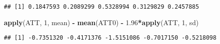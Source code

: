\documentclass[]{article}
\newenvironment{Shaded}{\begin{snugshade}}{\end{snugshade}}
\newcommand{\KeywordTok}[1]{\textcolor[rgb]{0.13,0.29,0.53}{\textbf{#1}}}
\newcommand{\DecValTok}[1]{\textcolor[rgb]{0.00,0.00,0.81}{#1}}
\newcommand{\FloatTok}[1]{\textcolor[rgb]{0.00,0.00,0.81}{#1}}
\newcommand{\StringTok}[1]{\textcolor[rgb]{0.31,0.60,0.02}{#1}}
\newcommand{\OperatorTok}[1]{\textcolor[rgb]{0.81,0.36,0.00}{\textbf{#1}}}
\newcommand{\NormalTok}[1]{#1}
\begin{document}
\begin{verbatim}
## [1] 0.1847593 0.2089299 0.5328994 0.3129829 0.2457885
\end{verbatim}

\begin{Shaded}
\begin{Highlighting}[]
\KeywordTok{apply}\NormalTok{(ATT, }\DecValTok{1}\NormalTok{, mean) }\OperatorTok{-}\StringTok{ }\KeywordTok{mean}\NormalTok{(ATT0) }\OperatorTok{-}\StringTok{ }\FloatTok{1.96}\OperatorTok{*}\KeywordTok{apply}\NormalTok{(ATT, }\DecValTok{1}\NormalTok{, sd)}
\end{Highlighting}
\end{Shaded}

\begin{verbatim}
## [1] -0.7351320 -0.4171376 -1.5151086 -0.7017150 -0.5218098
\end{verbatim}
\end{document}
